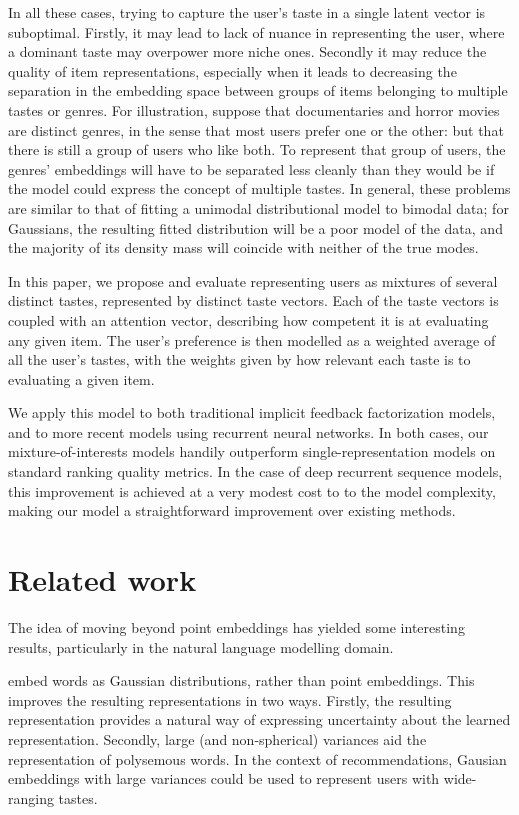 \documentclass[sigconf]{acmart}
\begin{document}
In all these cases, trying to capture the user's taste in a single latent vector is suboptimal. Firstly, it may lead to lack of nuance in representing the user, where a dominant taste may overpower more niche ones. Secondly it may reduce the quality of item representations, especially when it leads to decreasing the separation in the embedding space between groups of items belonging to multiple tastes or genres. For illustration, suppose that documentaries and horror movies are distinct genres, in the sense that most users prefer one or the other: but that there is still a group of users who like both. To represent that group of users, the genres' embeddings will have to be separated less cleanly than they would be if the model could express the concept of multiple tastes. In general, these problems are similar to that of fitting a unimodal distributional model to bimodal data; for Gaussians, the resulting fitted distribution will be a poor model of the data, and the majority of its density mass will coincide with neither of the true modes.

In this paper, we propose and evaluate representing users as mixtures of several distinct tastes, represented by distinct taste vectors. Each of the taste vectors is coupled with an attention vector, describing how competent it is at evaluating any given item. The user's preference is then modelled as a weighted average of all the user's tastes, with the weights given by how relevant each taste is to evaluating a given item.

We apply this model to both traditional implicit feedback factorization models, and to more recent models using recurrent neural networks. In both cases, our mixture-of-interests models handily outperform single-representation models on standard ranking quality metrics. In the case of deep recurrent sequence models, this improvement is achieved at a very modest cost to to the model complexity, making our model a straightforward improvement over existing methods.

\section{Related work}
The idea of moving beyond point embeddings has yielded some interesting results, particularly in the natural language modelling domain.

\citet{vilnis2014word} embed words as Gaussian distributions, rather than point embeddings. This improves the resulting representations in two ways. Firstly, the resulting representation provides a natural way of expressing uncertainty about the learned representation. Secondly, large (and non-spherical) variances aid the representation of polysemous words. In the context of recommendations, Gausian embeddings with large variances could be used to represent users with wide-ranging tastes.
\end{document}
